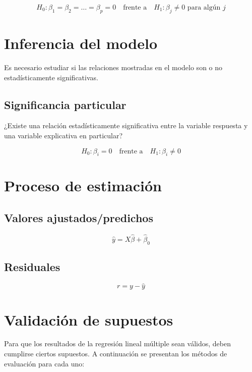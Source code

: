 \documentclass[
  letterpaper,
  DIV=11,
  numbers=noendperiod]{scrreprt}
\begin{document}
\[H_0:\beta_1 = \beta_2 = \ldots = \beta_p = 0
\quad\text{frente a}\quad
H_1:\beta_j\neq 0 \text{ para algún } j\]

\section{Inferencia del modelo}\label{inferencia-del-modelo-1}

Es necesario estudiar si las relaciones mostradas en el modelo son o no
estadísticamente significativas.

\subsection{Significancia particular}\label{significancia-particular}

¿Existe una relación estadísticamente significativa entre la variable
respuesta y una variable explicativa en particular?

\[
H_0:\beta_i = 0
\quad\text{frente a}\quad
H_1:\beta_i\neq 0
\]

\section{Proceso de estimación}\label{proceso-de-estimaciuxf3n-2}

\subsection{Valores
ajustados/predichos}\label{valores-ajustadospredichos}

\[
\hat{y} = X\hat{\beta} + \hat\beta_0
\]

\subsection{Residuales}\label{residuales}

\[
r = y - \hat{y}
\]

\section{Validación de supuestos}\label{validaciuxf3n-de-supuestos}

Para que los resultados de la regresión lineal múltiple sean válidos,
deben cumplirse ciertos supuestos. A continuación se presentan los
métodos de evaluación para cada uno:
\end{document}
